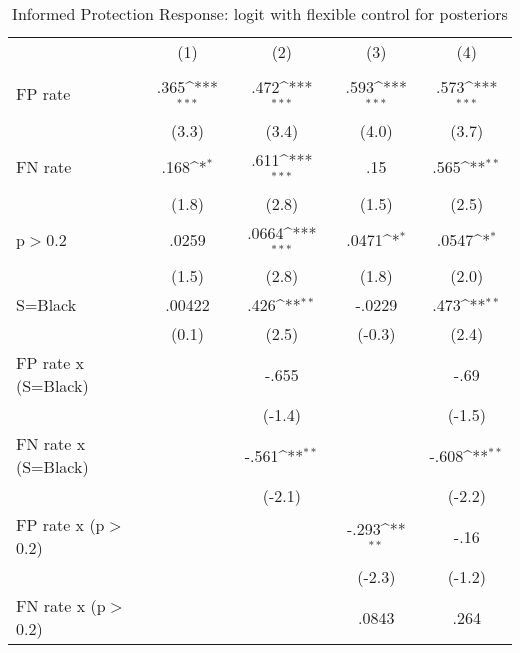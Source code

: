 \begin{table}[htbp]\centering
\def\sym#1{\ifmmode^{#1}\else\(^{#1}\)\fi}
\caption{Informed Protection Response: logit with flexible control for posteriors}
\begin{tabular}{l*{4}{c}}
\hline\hline
                &\multicolumn{1}{c}{(1)}&\multicolumn{1}{c}{(2)}&\multicolumn{1}{c}{(3)}&\multicolumn{1}{c}{(4)}\\
                &\multicolumn{1}{c}{}&\multicolumn{1}{c}{}&\multicolumn{1}{c}{}&\multicolumn{1}{c}{}\\
\hline
FP rate         &     .365\sym{***}&     .472\sym{***}&     .593\sym{***}&     .573\sym{***}\\
                &    (3.3)         &    (3.4)         &    (4.0)         &    (3.7)         \\
FN rate         &     .168\sym{*}  &     .611\sym{***}&      .15         &     .565\sym{**} \\
                &    (1.8)         &    (2.8)         &    (1.5)         &    (2.5)         \\
p$>$0.2         &    .0259         &    .0664\sym{***}&    .0471\sym{*}  &    .0547\sym{*}  \\
                &    (1.5)         &    (2.8)         &    (1.8)         &    (2.0)         \\
S=Black         &   .00422         &     .426\sym{**} &   -.0229         &     .473\sym{**} \\
                &    (0.1)         &    (2.5)         &   (-0.3)         &    (2.4)         \\
FP rate x (S=Black)&                  &    -.655         &                  &     -.69         \\
                &                  &   (-1.4)         &                  &   (-1.5)         \\
FN rate x (S=Black)&                  &    -.561\sym{**} &                  &    -.608\sym{**} \\
                &                  &   (-2.1)         &                  &   (-2.2)         \\
FP rate x (p$>$0.2)&                  &                  &    -.293\sym{**} &     -.16         \\
                &                  &                  &   (-2.3)         &   (-1.2)         \\
FN rate x (p$>$0.2)&                  &                  &    .0843         &     .264         \\

\end{tabular}
\end{table}
